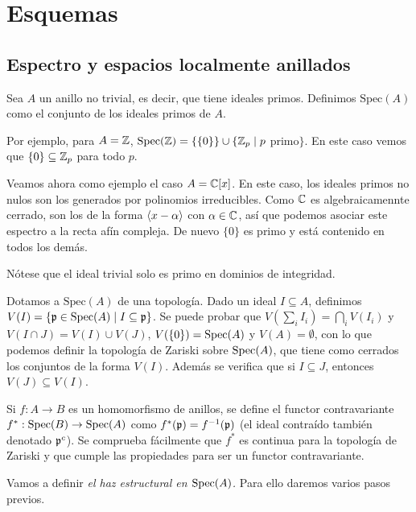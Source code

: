 \documentclass[GA.tex]{subfiles}
\begin{document}

\chapter{Esquemas}

\section{Espectro y espacios localmente anillados}

\begin{defi}
Sea $A$ un anillo no trivial, es decir, que tiene ideales primos. Definimos $\mathrm{Spec}(A)$ como el conjunto de los ideales primos de $A$. 
\end{defi}

Por ejemplo, para $A=\mathbb{Z}$, $\mathrm{Spec}(\mathbb{Z})=\{\{0\}\}\cup\{\mathbb{Z}_p\mid p$ primo$\}$. En este caso vemos que $\{0\}\subseteq\mathbb{Z}_p$ para todo $p$. 

Veamos ahora como ejemplo el caso $A=\mathbb{C}[x]$. En este caso, los ideales primos no nulos son los generados por polinomios irreducibles. Como $\mathbb{C}$ es algebraicamennte cerrado, son los de la forma $\langle{x-\alpha}\rangle$ con $\alpha\in\mathbb{C}$, así que podemos asociar este espectro a la recta afín compleja. De nuevo $\{0\}$ es primo y está contenido en todos los demás. 

Nótese que el ideal trivial solo es primo en dominios de integridad.

Dotamos a $\mathrm{Spec}(A)$ de una topología. Dado un ideal $I\subseteq A$, definimos $V(I)=\{{\mathfrak{p}}\in\operatorname{Spec}(A)\mid I\subseteq{\mathfrak{p}}\}$. Se puede probar que $V(\sum_i I_i)=\bigcap_i V(I_i)$ y $V(I\cap J)=V(I)\cup V(J)$, $V(\{0\})=\operatorname{Spec}(A)$ y $V(A)=\emptyset$, con lo que podemos definir la topología de Zariski sobre $\operatorname{Spec}(A)$, que tiene como cerrados los conjuntos de la forma $V(I)$. Además se verifica que si $I\subseteq J$, entonces $V(J)\subseteq V(I)$. 

Si $f:A\to B$ es un homomorfismo de anillos, se define el functor contravariante $f^*:\operatorname{Spec}(B)\to\operatorname{Spec}(A)$ como $f^*({\mathfrak{p}})=f^{-1}({\mathfrak{p}})$ (el ideal contraído también denotado ${\mathfrak{p}}^c$). Se comprueba fácilmente que $f^*$ es continua para la topología de Zariski y que cumple las propiedades para ser un functor contravariante. 

Vamos a definir \emph{el haz estructural en $\operatorname{Spec}(A)$.} Para ello daremos varios pasos previos.
\end{document}
